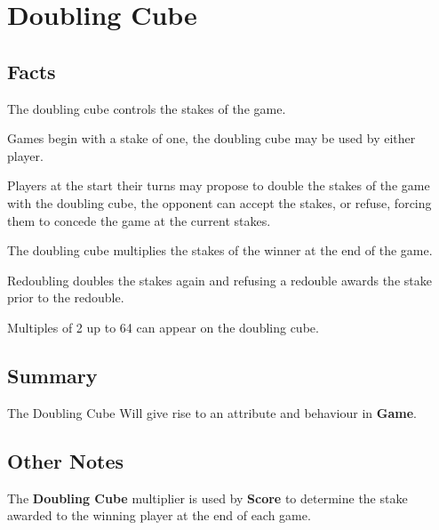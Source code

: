 \section{Doubling Cube}

\subsection{Facts}

\begin{dashed}
    \item The doubling cube controls the stakes of the game.
    \item Games begin with a stake of one, the doubling cube may be used by either player.
    \item Players at the start their turns may propose to double the stakes of the game
          with the doubling cube, the opponent can accept the stakes, or refuse, forcing them
          to concede the game at the current stakes.
    \item The doubling cube multiplies the stakes of the winner at the end of the game.
    \item Redoubling doubles the stakes again and refusing a redouble awards the stake prior to the             redouble.
    \item Multiples of 2 up to 64 can appear on the doubling cube.
\end{dashed}


\subsection{Summary}
The Doubling Cube Will give rise to an attribute and behaviour in \textbf{Game}.

\subsection{Other Notes}

\begin{dashed}
    \item The \textbf{Doubling Cube} multiplier is used by \textbf{Score} to determine the stake awarded to the winning player at the end of each game.
\end{dashed}

